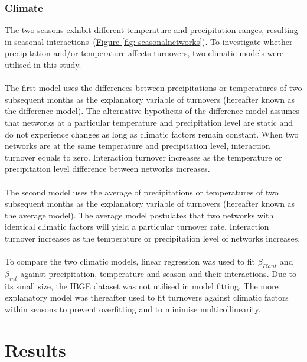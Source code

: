 \documentclass[11pt]{article}
\begin{document}
\subsubsection{Climate}
The two seasons exhibit different temperature and precipitation ranges, resulting in seasonal interactions~(\hyperref[fig: seasonalnetworks]{Figure \ref{fig: seasonalnetworks}}). To investigate whether precipitation and/or temperature affects turnovers, two climatic models were utilised in this study. \\
\\
The first model uses the differences between precipitations or temperatures of two subsequent months as the explanatory variable of turnovers (hereafter known as the difference model). The alternative hypothesis of the difference model assumes that networks at a particular temperature and precipitation level are static and do not experience changes as long as climatic factors remain constant. When two networks are at the same temperature and precipitation level, interaction turnover equals to zero. Interaction turnover increases as the temperature or precipitation level difference between networks increases.\\
\\
The second model uses the average of precipitations or temperatures of two subsequent months as the explanatory variable of turnovers (hereafter known as the average model). The average model postulates that two networks with identical climatic factors will yield a particular turnover rate. Interaction turnover increases as the temperature or precipitation level of networks increases.\\
\\
To compare the two climatic models, linear regression was used to fit $\beta_{Plant}$ and $\beta_{int}$ against precipitation, temperature and season and their interactions. Due to its small size, the IBGE dataset was not utilised in model fitting. The more explanatory model was thereafter used to fit turnovers against climatic factors within seasons to prevent overfitting and to minimise multicollinearity.

\newpage
\section{Results}
\label{sec: Results} %
\end{document}

